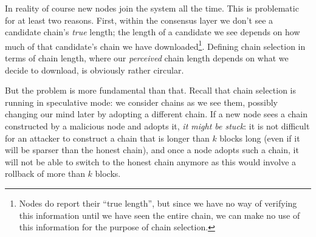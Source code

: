 In reality of course new nodes join the system all the time. This is problematic
for at least two reasons. First, within the consensus layer we don't see a
candidate chain's \emph{true} length; the length of a candidate we see depends
on how much of that candidate's chain we have downloaded\footnote{Nodes do
report their ``true length'', but since we have no way of verifying this
information until we have seen the entire chain, we can make no use of this
information for the purpose of chain selection.}. Defining chain
selection in terms of chain length, where our \emph{perceived} chain length
depends on what we decide to download, is obviously rather circular.

But the problem is more fundamental than that. Recall that chain
selection is running in speculative mode: we consider chains as we see them,
possibly changing our mind later by adopting a different chain. If a new node
sees a chain constructed by a malicious node and adopts it, \emph{it might be
stuck}: it is not difficult for an attacker to construct a chain that is longer
than $k$ blocks long (even if it will be sparser than the honest chain), and
once a node adopts such a chain, it will not be able to switch to the honest
chain anymore as this would involve a rollback of more than $k$ blocks.

